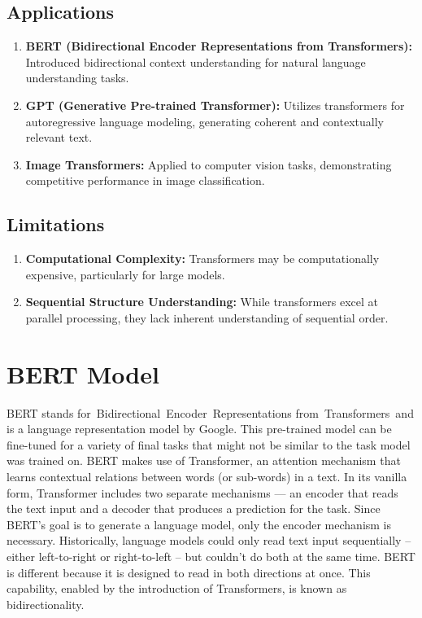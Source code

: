 \subsection*{Applications}
\begin{enumerate}
    \item \textbf{BERT (Bidirectional Encoder Representations from Transformers):} Introduced bidirectional context understanding for natural language understanding tasks.
    \item \textbf{GPT (Generative Pre-trained Transformer):} Utilizes transformers for autoregressive language modeling, generating coherent and contextually relevant text.
    \item \textbf{Image Transformers:} Applied to computer vision tasks, demonstrating competitive performance in image classification.
\end{enumerate}

\subsection*{Limitations}
\begin{enumerate}
    \item \textbf{Computational Complexity:} Transformers may be computationally expensive, particularly for large models.
    \item \textbf{Sequential Structure Understanding:} While transformers excel at parallel processing, they lack inherent understanding of sequential order.
\end{enumerate}

\section{BERT Model}
\cite{Bert}
BERT stands for Bidirectional Encoder Representations from Transformers and is a language representation model by Google.
This pre-trained model can be fine-tuned for a variety of final tasks that might not be similar to the task model was trained on.
BERT makes use of Transformer, an attention mechanism that learns contextual relations between words (or sub-words) in a text. In its vanilla form, Transformer includes two separate mechanisms — an encoder that reads the text input and a decoder that produces a prediction for the task. Since BERT’s goal is to generate a language model, only the encoder mechanism is necessary.
Historically, language models could only read text input sequentially -- either left-to-right or right-to-left -- but couldn't do both at the same time. BERT is different because it is designed to read in both directions at once. This capability, enabled by the introduction of Transformers, is known as bidirectionality.


